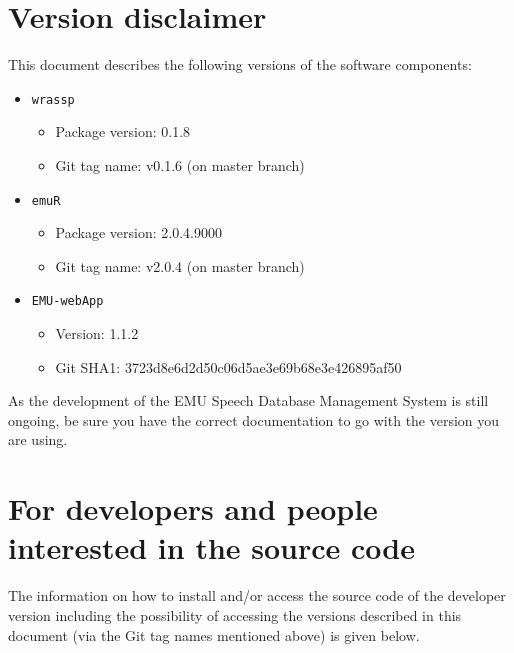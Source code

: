 \documentclass[]{book}
\providecommand{\tightlist}{%
  \setlength{\itemsep}{0pt}\setlength{\parskip}{0pt}}
\begin{document}
\hypertarget{version-disclaimer}{%
\section{Version disclaimer}\label{version-disclaimer}}

This document describes the following versions of the software components:

\begin{itemize}
\tightlist
\item
  \texttt{wrassp}

  \begin{itemize}
  \tightlist
  \item
    Package version: 0.1.8
  \item
    Git tag name: v0.1.6 (on master branch)
  \end{itemize}
\item
  \texttt{emuR}

  \begin{itemize}
  \tightlist
  \item
    Package version: 2.0.4.9000
  \item
    Git tag name: v2.0.4 (on master branch)
  \end{itemize}
\item
  \texttt{EMU-webApp}

  \begin{itemize}
  \tightlist
  \item
    Version: 1.1.2
  \item
    Git SHA1: 3723d8e6d2d50c06d5ae3e69b68e3e426895af50
  \end{itemize}
\end{itemize}

As the development of the EMU Speech Database Management System is still ongoing, be sure you have the correct documentation to go with the version you are using.

\hypertarget{for-developers-and-people-interested-in-the-source-code}{%
\section{For developers and people interested in the source code}\label{for-developers-and-people-interested-in-the-source-code}}

The information on how to install and/or access the source code of the developer version including the possibility of accessing the versions described in this document (via the Git tag names mentioned above) is given below.
\end{document}
